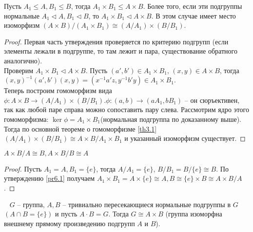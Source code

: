 \begin{proposition}
    Пусть $A_1 \leq A, B_1 \leq B$, тогда $A_1 \times B_1 \leq A \times B$. Более того, если эти подгруппы нормальные $A_1 \lhd A, B_1 \lhd B$, то $A_1 \times B_1 \lhd A \times B$. В этом случае имеет место изоморфизм $(A \times B)/(A_1 \times B_1) \cong (A/A_1) \times (B/B_1)$.
\end{proposition}

\begin{proof}
    Первая часть утверждения проверяется по критерию подгрупп (если элементы лежали в подгруппе, то там лежит и пара, существование обратного аналогично). \\
    Проверим $A_1 \times B_1 \lhd A \times B$. Пусть $(a', b') \in A_1 \times B_1$, $(x, y) \in A \times B$, тогда $(x, y)^{-1}(a', b')(x, y) = (x^{-1}a'z, y^{-1}b'y) \in A_1 \times B_1$. \\
    Теперь построим гомоморфизм вида $\phi: A \times B \to (A/A_1) \times (B/B_1). \phi: (a, b) \to (aA_1, bB_1)$ -- он сюръективен, так как любой паре справа можно сопоставить пару слева. Рассмотрим ядро этого гомоморфизма: $\ker \phi = A_1 \times B_1$(нормальная подгруппа по доказанному выше). Тогда по основной теореме о гомоморфизме \ref{th3.1} $(A/A_1) \times (B/B_1) \cong A \times B/ A_1 \times B_1$ и указанный изоморфизм существует.
\end{proof}

\begin{corollary}
    $A \times B/A \cong B, A \times B/B \cong A$
\end{corollary}

\begin{proof}
    Пусть $A_1 = A, B_1 = \{ e \}$, тогда $A/A_1 = \{ e \}$, $B/B_1 = B/\{ e \} \cong B$. По утверждению \ref{pr6.1} получаем $A_1 \times B_1 = A \times \{ e \} \cong A, B \cong \{ e \} \times B \cong A \times B/A$.
\end{proof}

\begin{theorem}~
\label{th6.1}
    $G$ -- группа, $A, B$ -- тривиально пересекающиеся нормальные подгруппы в $G$ $(A \cap B = \{ e \})$ и пусть $A \cdot B = G$. Тогда $G \cong A \times B$ (группа изоморфна внешнему прямому произведению подгрупп $A$ и $B$).
\end{theorem}

